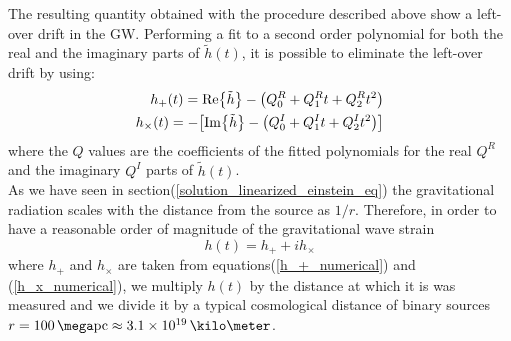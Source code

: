 The resulting quantity obtained with the procedure described above show a left-over  drift in the GW. Performing a fit to a second order polynomial for both the real and the imaginary parts of $\tilde{h}(t)$, it is possible to eliminate the left-over  drift by using:
\begin{eqnarray}
\label{h_+_numerical}
h_{+} (t)= \Re {\tilde{h}} -  \qty(Q_0 ^{R} + Q_1 ^{R} t + Q_2 ^{R} t^{2}) \\
\label{h_x_numerical}
h_{\times}(t) = - \qty[
\Im {\tilde{h}} -
\qty(Q_0 ^{I} + Q_1 ^{I} t + Q_2 ^{I} t^{2})
]
\end{eqnarray}
where the $Q$ values are the coefficients of the fitted polynomials for the real $Q^{R}$ and the imaginary $Q^{I}$ parts of $\tilde{h}(t)$.\\
As we have seen in section(\ref{solution_linearized_einstein_eq}) the gravitational radiation scales with the distance from the source as $1/r$.
Therefore, in order to have a reasonable order of magnitude of the gravitational wave strain
\begin{equation}
h(t) = h_{+} + i h_{\times}
\end{equation} 
where $h_{+}$ and $h_{\times}$ are taken from equations(\ref{h_+_numerical}) and (\ref{h_x_numerical}), we multiply $h(t)$ by the distance at which it is was measured and we divide it by a typical cosmological distance of binary sources $r=100 \, \mega \text{pc} \approx 3.1 \times 10^{19} \, \kilo \meter$.

